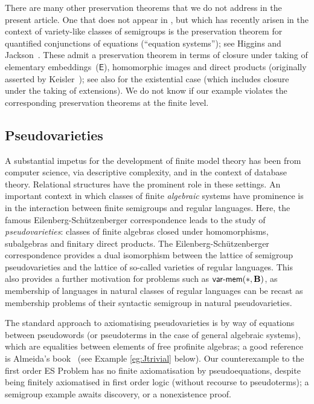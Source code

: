 \documentclass[reqno]{amsart}
\theoremstyle{plain}
\theoremstyle{definition}
\newcommand{\varmem}{\textsf{var-mem}}
\begin{document}
There are many other preservation theorems that we do not address in the present article.  One that does not appear in \cite{alegur,rosen}, but which has recently arisen in the context of variety-like classes of semigroups is the preservation theorem for quantified conjunctions of equations (``equation systems''); see Higgins and Jackson~\cite{higjac}.  
These admit a preservation theorem in terms of closure under taking of elementary embeddings~($\textsf{E}$), homomorphic images and direct products (originally asserted by Keisler~\cite{kei}); see also  \cite{higjac23} for the existential case (which includes closure under the taking of extensions).  We do not know if our example violates the corresponding preservation theorems at the finite level.


\subsection{Pseudovarieties} 
A substantial impetus for the development of finite model theory has been from computer science, via descriptive complexity, and in the context of database theory.  Relational structures have the prominent role in these settings.
An important context in which classes of finite \emph{algebraic} systems have prominence is in the interaction between finite semigroups and regular languages.  Here, the famous Eilenberg-Sch\"utzenberger correspondence \cite{eil} leads to the study of \emph{pseudovarieties}: classes of finite algebras closed under homomorphisms, subalgebras and finitary direct products.  The Eilenberg-Sch\"utzenberger correspondence provides a dual isomorphism between the lattice of semigroup pseudovarieties and the lattice of so-called varieties of regular languages.  This also provides a further motivation for  problems such as $\varmem(*,{\bf B})$, as membership of languages in natural classes of regular languages can be recast as membership problems of their syntactic semigroup in natural pseudovarieties.  

The standard approach to axiomatising pseudovarieties is by way of equations between pseudowords (or pseudoterms in the case of general algebraic systems), which are  equalities between elements of free profinite algebras; a good reference is Almeida's book~\cite{alm} (see Example \ref{eg:Jtrivial} below).   
Our counterexample to the first order ES Problem has no finite axiomatisation by pseudoequations, despite being finitely axiomatised in first order logic (without recourse to pseudoterms); a semigroup example awaits discovery, or a nonexistence proof.
\end{document}

